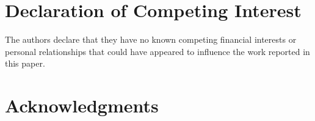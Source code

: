 \documentclass[final,5p,times,twocolumn]{elsarticle}
\begin{document}
\section{Declaration of Competing Interest}
The authors declare that they have no known competing financial interests or personal relationships that could have appeared to influence the work reported in this paper.
\section{Acknowledgments}

  
 





\end{document}
